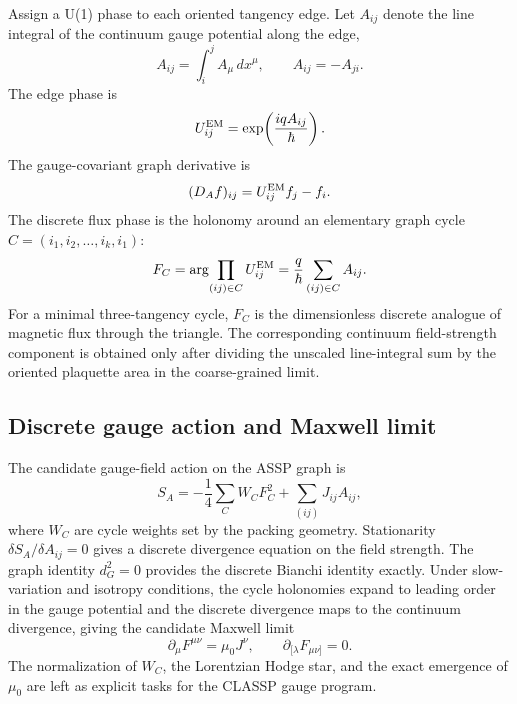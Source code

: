 \documentclass[11pt,a4paper]{article}
\begin{document}
Assign a U(1) phase to each oriented tangency edge.  Let $A_{ij}$ denote the
line integral of the continuum gauge potential along the edge,
\begin{equation}
  A_{ij}=\int_i^j A_\mu\,dx^\mu,\qquad A_{ij}=-A_{ji}.
\end{equation}
The edge phase is
\begin{equation}
  U_{ij}^{\rm EM}=\exp\!\left(\frac{iqA_{ij}}{\hbar}\right).
  \label{eq:edge_phase}
\end{equation}
The gauge-covariant graph derivative is
\begin{equation}
  (D_Af)_{ij}=U_{ij}^{\rm EM}f_j-f_i.
  \label{eq:cov_diff}
\end{equation}
The discrete flux phase is the holonomy around an elementary graph cycle
$C=(i_1,i_2,\ldots,i_k,i_1)$:
\begin{equation}
  F_C=\arg\!\prod_{(ij)\in C}U_{ij}^{\rm EM}
  =\frac{q}{\hbar}\sum_{(ij)\in C}A_{ij}.
  \label{eq:holonomy}
\end{equation}
For a minimal three-tangency cycle, $F_C$ is the dimensionless discrete analogue of magnetic flux through the triangle.  The corresponding continuum field-strength component is obtained only after dividing the unscaled line-integral sum by the oriented plaquette area in the coarse-grained limit.

\subsection{Discrete gauge action and Maxwell limit}

The candidate gauge-field action on the ASSP graph is
\begin{equation}
  S_A=-\frac14\sum_C W_C F_C^2+\sum_{(ij)}J_{ij}A_{ij},
  \label{eq:gauge_action}
\end{equation}
where $W_C$ are cycle weights set by the packing geometry. Stationarity
$\delta S_A/\delta A_{ij}=0$ gives a discrete divergence equation on the field
strength. The graph identity $d_G^2=0$ provides the discrete Bianchi identity
exactly. Under slow-variation and isotropy conditions, the cycle holonomies
expand to leading order in the gauge potential and the discrete divergence
maps to the continuum divergence, giving the candidate Maxwell limit
\begin{equation}
  \boxed{\partial_\mu F^{\mu\nu}=\mu_0J^\nu,\qquad
  \partial_{[\lambda}F_{\mu\nu]}=0.}
  \label{eq:maxwell}
\end{equation}
The normalization of $W_C$, the Lorentzian Hodge star, and the exact emergence
of $\mu_0$ are left as explicit tasks for the CLASSP gauge program.
\end{document}
